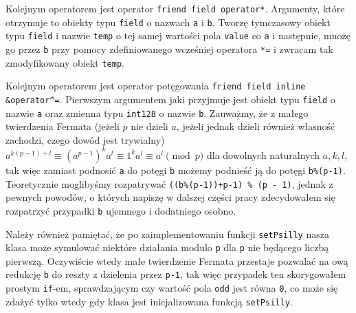 \documentclass{article}
\begin{document}
Kolejnym operatorem jest operator \texttt{friend field operator*}. Argumenty, które otrzymuje
to obiekty typu \texttt{field} o nazwach \texttt{a} i \texttt{b}. Tworzę tymczasowy obiekt typu \texttt{field} i nazwie \texttt{temp}
o tej samej wartości pola \texttt{value} co \texttt{a} i następnie, mnożę go przez \texttt{b} przy pomocy
zdefiniowanego wcześniej operatora \texttt{*=} i zwracam tak zmodyfikowany obiekt \texttt{temp}.

Kolejnym operatorem jest operator potęgowania \texttt{friend field inline \&operator}\verb!^!\texttt{=}. 
Pierwszym argumentem jaki przyjmuje jest obiekt typu \texttt{field} o nazwie \texttt{a} oraz zmienna typu 
\texttt{\textunderscore \textunderscore int128} o
nazwie \texttt{b}. Zauważmy, że z małego twierdzenia Fermata (jeżeli $p$ nie dzieli $a$, jeżeli jednak dzieli również własność zachodzi, 
czego dowód jest trywialny) $a^{k(p-1)+l} \equiv (a^{p-1})^ka^l \equiv 1^ka^l \equiv a^l \pmod p$ dla dowolnych naturalnych
$a,k,l$, tak więc
zamiast podnosić \texttt{a} do potęgi \texttt{b} możemy podnieść ją do potęgi \texttt{b\%(p-1)}.
Teoretycznie moglibyśmy rozpatrywać \texttt{((b\%(p-1))+p-1) \% (p - 1)}, jednak z pewnych powodów, o 
których napiszę w dalszej części pracy zdecydowałem się rozpatrzyć przypadki \texttt{b} ujemnego i 
dodatniego osobno. 

Należy również pamiętać, że po zaimplementowaniu funkcji \texttt{setPsilly}
nasza klasa może symulować niektóre działania modulo \texttt{p} dla \texttt{p}
nie będącego liczbą pierwszą. Oczywiście wtedy małe twierdzenie Fermata
przestaje pozwalać na ową redukcję \texttt{b} do reszty z dzielenia przez
\texttt{p-1}, tak więc przypadek ten skorygowałem prostym \texttt{if}-em, sprawdzającym 
czy wartość pola \texttt{odd} jest równa \texttt{0}, co może się zdażyć tylko wtedy gdy klasa 
jest inicjalizowana funkcją \texttt{setPsilly}.
\end{document}
